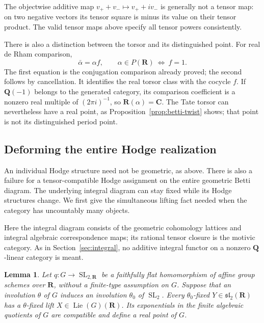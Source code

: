 \documentclass[11pt]{article}
\newtheorem{lemma}[theorem]{Lemma}
\theoremstyle{definition}\newtheorem{definition}[theorem]{Definition}
\theoremstyle{remark}\newtheorem{remark}[theorem]{Remark}
\newcommand{\Q}{\mathbf Q}\newcommand{\Z}{\mathbf Z}
\newcommand{\R}{\mathbf R}\newcommand{\C}{\mathbf C}
\DeclareMathOperator{\Lie}{Lie}\DeclareMathOperator{\trdeg}{trdeg}
\DeclareMathOperator{\SL}{SL}\DeclareMathOperator{\End}{End}
\begin{document}
The objectwise additive map $v_++v_-\mapsto v_++iv_-$ is generally not a tensor map: on two negative vectors its tensor square is minus its value on their tensor product. The valid tensor maps above specify all tensor powers consistently.

There is also a distinction between the torsor and its distinguished point. For real de Rham comparison,
\[
             \bar\alpha=\alpha f,\qquad
             \alpha\in P(\R)\ \Longleftrightarrow\ f=1.
\]
The first equation is the conjugation comparison already proved; the second follows by cancellation. It identifies the real torsor class with the cocycle $f$. If $\Q(-1)$ belongs to the generated category, its comparison coefficient is a nonzero real multiple of $(2\pi i)^{-1}$, so $\R(\alpha)=\C$. The Tate torsor can nevertheless have a real point, as Proposition~\ref{prop:betti-twist} shows; that point is not its distinguished period point.

\subsection{Deforming the entire Hodge realization}

An individual Hodge structure need not be geometric, as above. There is also
a failure for a tensor-compatible Hodge assignment on the entire geometric
Betti diagram. The underlying integral diagram can stay fixed while its Hodge
structures change. We first give the simultaneous lifting fact needed when
the category has uncountably many objects.

Here the integral diagram consists of the geometric cohomology lattices and
integral algebraic correspondence maps; its rational tensor closure is the
motivic category. As in Section~\ref{sec:integral}, no additive integral
functor on a nonzero $\Q$-linear category is meant.

\begin{lemma}\label{lem:prolie-lift}
Let $q:G\to\SL_{2,\R}$ be a faithfully flat homomorphism of affine group
schemes over $\R$, without a finite-type assumption on $G$. Suppose that an
involution $\theta$ of $G$ induces an involution $\theta_0$ of $\SL_2$.
Every $\theta_0$-fixed $Y\in\mathfrak{sl}_2(\R)$ has a $\theta$-fixed lift
$X\in\Lie(G)(\R)$. Its exponentials in the finite algebraic quotients of $G$
are compatible and define a real point of $G$.
\end{lemma}
\end{document}
